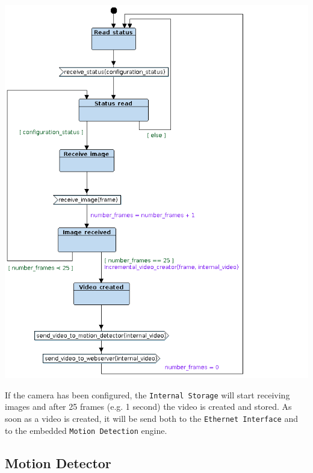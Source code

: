 \documentclass{article}
\begin{document}
\begin{minipage}{\linewidth}
  \centering
  \begin{minipage}{0.60\linewidth}
    \includegraphics[width = \textwidth]{Foscam07.png}
  \end{minipage}
  \begin{minipage}{0.35\linewidth}
    If the camera has been configured, the \texttt{Internal Storage} will start
    receiving images and after 25 frames (e.g. 1 second) the video is created
    and stored. As soon as a video is created, it will be send both to the
    \texttt{Ethernet Interface} and to the embedded \texttt{Motion Detection}
    engine.
  \end{minipage}
\end{minipage}

\subsection{Motion Detector}
\label{sec:Motion Detector}
\end{document}

